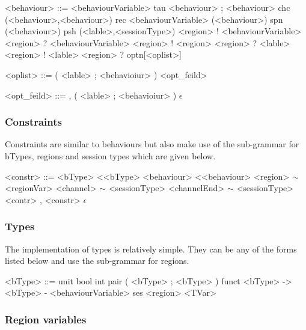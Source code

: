 \begin{grammar}
<behaviour> ::= <behaviourVariable>
\alt tau
\alt <behaviour> ; <behaviour>
\alt chc (<behaviour>,<behaviour>)
\alt rec <behaviourVariable> (<behaviour>)
\alt spn (<behaviour>)
\alt psh (<lable>,<sessionType>)
\alt <region> ! <behaviourVariable>
\alt <region> ? <behaviourVariable>
\alt <region> ! <region>
\alt <region> ? <lable>
\alt <region> ! <lable>
\alt <region> ? optn[<oplist>]

<oplist> ::= ( <lable> ; <behavioiur> ) <opt_feild>

<opt_feild> ::= , ( <lable> ; <behavioiur> )
\alt $\epsilon$

\end{grammar}

\subsubsection{Constraints}

Constraints are similar to behaviours but also make use of the sub-grammar for bTypes, regions and session types which are given below. 

\begin{grammar}

<constr> ::= <bType> \textless <bType>
\alt <behaviour> \textless <behaviour>
\alt <region> $\sim$ <regionVar>
\alt <channel> $\sim$ <sessionType>
\alt <channelEnd> $\sim$ <sessionType>
\alt <contr> , <constr>
\alt $\epsilon$

\end{grammar}

\subsubsection{Types}

The implementation of types is relatively simple. They can be any of the forms listed below and use the sub-grammar for regions. 
\begin{grammar}

<bType> ::= unit
\alt bool 
\alt int
\alt pair ( <bType> ; <bType> )
\alt funct <bType> -\textgreater <bType> - <behaviourVariable>
\alt ses <region>
\alt <TVar>

\end{grammar}

\subsubsection {Region variables}

